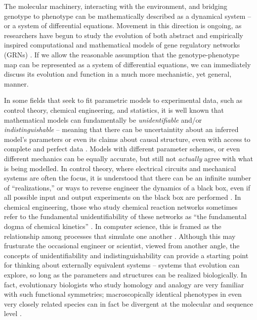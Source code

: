 \documentclass[11 pt]{article}
\begin{document}
The molecular machinery, interacting with the environment, and bridging genotype to phenotype
can be mathematically described as a dynamical system -- or a system of differential equations\citep{jaeger2015comet}.
 Movement in this direction is ongoing, as researchers have begun to study 
the evolution of both abstract \citep{wagner1994evolution, wagner1996does,  siegal2002waddington, bergman2003evolutionary} and empirically inspired computational and mathematical models of gene regulatory networks (GRNs) \citep{mjolsness1991connectionist, jaeger2004dynamic, maria1, vitaly1, vitaly2, crombach2016gap, wotton2015quantitative}. If we allow the reasonable assumption that the genotype-phenotype map can be represented as a system of differential equations, we can immediately discuss its evolution and function in a much more mechanistic, yet general, manner. 

In some fields that seek to fit parametric models to experimental data, such as control
theory, chemical engineering, and statistics, it is well known that mathematical models
can fundamentally be \emph{unidentifiable} and/or \emph{indistinguishable} -- meaning that 
there can be uncertaintity about an inferred model's parameters or even its claims about
causal structure, even with access to complete and perfect data \citep{bellman1970structural, grewal1976identifiability, walter1984structural}. Models with different 
parameter schemes, or even different mechanics can be equally accurate, but still not
\emph{actually} agree with what is being modelled. In control theory, where electrical 
circuits and mechanical systems are often the focus, it is understood that there can be an 
infinite number of ``realizations,'' or ways to reverse engineer the dynamics of a black box,
even if all possible input and output experiments on the black box are performed \citep{kalman1963mathematical, anderson1966equivalence, zadeh1976linear}. In chemical
engineering, those who study chemical reaction networks sometimes refer to the fundamental
unidentifiability of these networks as ``the fundamental dogma of chemical kinetics'' \citep{craciun2008identifiability}. In computer science, this is framed as the relationship among processes that simulate one another \citep{van2004equivalence}.
Although this may frusturate the occasional engineer or scientist, viewed from another angle,
the concepts of unidentifiability and indistinguishability can provide a starting point for
thinking about externally equivalent systems -- systems that evolution can explore, so long
as the parameters and structures can be realized biologically. In fact, evolutionary
biologists who study homology and analogy are very familiar with such functional symmetries; macroscopically identical phenotypes in even very closely related species can in fact be divergent at the molecular and sequence level \citep{true2001developmental, tsong2006evolution, hare2008sepsid, vierstra2014mouse, stergachis2014conservation, taylor2016diverse, matsui2015regulatory}.
\end{document}
